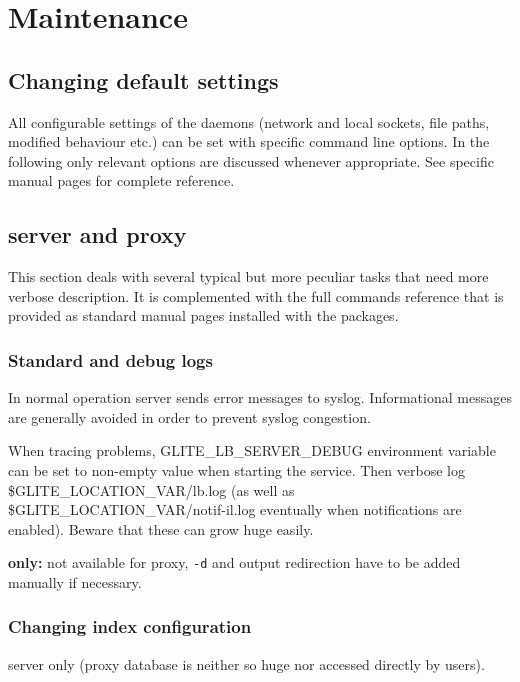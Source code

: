 \section{Maintenance}

\subsection{Changing default settings}
All configurable settings of the \LB daemons (network and local sockets, 
file paths, modified behaviour etc.) can be set with specific command line
options.
In the following only relevant options are discussed whenever appropriate.
See specific manual pages for complete reference.

\subsection{\LB server and proxy}

This section deals with several typical but more peculiar tasks
that need more verbose description.
It is complemented with the full commands reference that is provided
as standard manual pages installed with the \LB packages.

\subsubsection{Standard and debug logs}

In normal operation \LB server sends error messages to syslog.
Informational messages are generally avoided in order to prevent syslog congestion.

\begin{sloppypar}
When tracing problems, GLITE\_LB\_SERVER\_DEBUG environment variable can be set to
non-empty value when starting the service.
Then verbose log \$GLITE\_LOCATION\_VAR/lb.log 
(as well as \$GLITE\_LOCATION\_VAR/notif-il.log eventually when notifications are enabled).
Beware that these can grow huge easily.
\end{sloppypar}

\textbf{\LBold only:} not available for \LB proxy, \verb'-d' and output redirection
have to be added manually if necessary.

\subsubsection{Changing index configuration}
\label{maintain:index}

\LB server only (\LB proxy database is neither so huge nor accessed directly by users).

